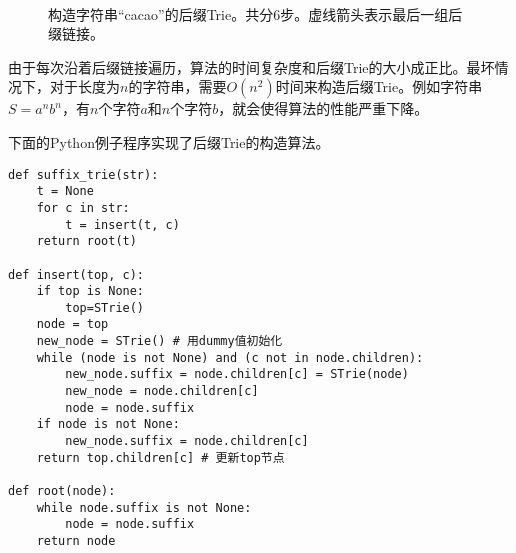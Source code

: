 \documentclass{ctexart}
\begin{document}
\begin{figure}[htbp]
  \centering
   \\
  \caption{构造字符串“cacao”的后缀Trie。共分6步。虚线箭头表示最后一组后缀链接。}
  \label{fig:cons-strie-cacao}
\end{figure}

由于每次沿着后缀链接遍历，算法的时间复杂度和后缀Trie的大小成正比。最坏情况下，对于长度为$n$的字符串，需要$O(n^2)$时间来构造后缀Trie。例如字符串$S=a^nb^n$，有$n$个字符$a$和$n$个字符$b$，就会使得算法的性能严重下降。

下面的Python例子程序实现了后缀Trie的构造算法。

\lstset{language=Python}
\begin{lstlisting}
def suffix_trie(str):
    t = None
    for c in str:
        t = insert(t, c)
    return root(t)

def insert(top, c):
    if top is None:
        top=STrie()
    node = top
    new_node = STrie() # 用dummy值初始化
    while (node is not None) and (c not in node.children):
        new_node.suffix = node.children[c] = STrie(node)
        new_node = node.children[c]
        node = node.suffix
    if node is not None:
        new_node.suffix = node.children[c]
    return top.children[c] # 更新top节点

def root(node):
    while node.suffix is not None:
        node = node.suffix
    return node
\end{lstlisting}
\end{document}

